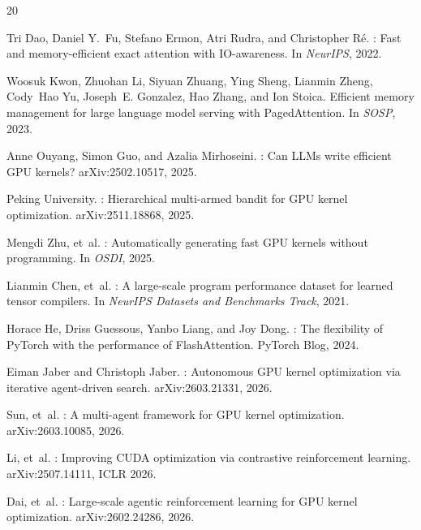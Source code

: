 \documentclass{article}
\begin{document}
\begin{thebibliography}{20}

Tri Dao, Daniel Y.~Fu, Stefano Ermon, Atri Rudra, and Christopher R\'{e}.
: Fast and memory-efficient exact attention with {IO}-awareness.
\newblock In \emph{NeurIPS}, 2022.

Woosuk Kwon, Zhuohan Li, Siyuan Zhuang, Ying Sheng, Lianmin Zheng, Cody~Hao Yu, Joseph~E. Gonzalez, Hao Zhang, and Ion Stoica.
\newblock Efficient memory management for large language model serving with {PagedAttention}.
\newblock In \emph{SOSP}, 2023.

Anne Ouyang, Simon Guo, and Azalia Mirhoseini.
: Can {LLMs} write efficient {GPU} kernels?
\newblock arXiv:2502.10517, 2025.

{Peking University}.
: Hierarchical multi-armed bandit for {GPU} kernel optimization.
\newblock arXiv:2511.18868, 2025.

Mengdi Zhu, et~al.
: Automatically generating fast {GPU} kernels without programming.
\newblock In \emph{OSDI}, 2025.

Lianmin Chen, et~al.
: A large-scale program performance dataset for learned tensor compilers.
\newblock In \emph{NeurIPS Datasets and Benchmarks Track}, 2021.

Horace He, Driss Guessous, Yanbo Liang, and Joy Dong.
: The flexibility of {PyTorch} with the performance of {FlashAttention}.
\newblock PyTorch Blog, 2024.

Eiman Jaber and Christoph Jaber.
: Autonomous {GPU} kernel optimization via iterative agent-driven search.
\newblock arXiv:2603.21331, 2026.

Sun, et~al.
: A multi-agent framework for {GPU} kernel optimization.
\newblock arXiv:2603.10085, 2026.

Li, et~al.
: Improving {CUDA} optimization via contrastive reinforcement learning.
\newblock arXiv:2507.14111, ICLR 2026.

Dai, et~al.
: Large-scale agentic reinforcement learning for {GPU} kernel optimization.
\newblock arXiv:2602.24286, 2026.


\end{thebibliography}
\end{document}

